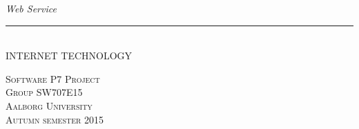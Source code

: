 \thispagestyle{empty}
\begin{flushright}
\vspace{3cm}

\phantom{hul}

\phantom{hul}

\phantom{hul}

\textsl{\Huge Web Service} \\ 


\rule{14cm}{2mm} \\ 
\Huge INTERNET TECHNOLOGY\\ \vspace{1.5cm}

\begin{figure}[H]
\end{figure}
\vspace{2cm} 
\textsc{\Large Software P7 Project \\
Group SW707E15 \\
Aalborg University\\
Autumn semester 2015\\}
\end{flushright}